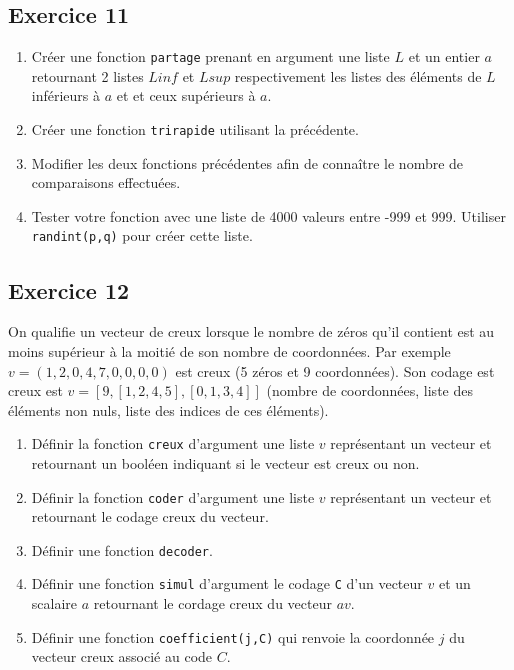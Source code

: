 \documentclass[10pt,fleqn]{article} %
\begin{document}
\begin{multicols}{2}
\subsection*{Exercice 11}
\begin{enumerate}
\item Créer une fonction \texttt{partage} prenant en argument une liste $L$ et un entier $a$ retournant 2 listes $Linf$ et $Lsup$ respectivement les listes des éléments de $L$ inférieurs à $a$ et et ceux supérieurs à $a$.
\item Créer une fonction \texttt{trirapide} utilisant la précédente. 
\item Modifier les deux fonctions précédentes afin de connaître le nombre de comparaisons effectuées. 
\item Tester votre fonction avec une liste de 4000 valeurs entre -999 et 999. Utiliser \texttt{randint(p,q)} pour créer cette liste.
\end{enumerate}

\subsection*{Exercice 12}
On qualifie un vecteur de creux lorsque le nombre de zéros qu'il contient est au moins supérieur à la moitié de son nombre de coordonnées. Par exemple $v=\left(1,2,0,4,7,0,0,0,0\right)$ est creux (5 zéros et 9 coordonnées). Son codage est creux est $v=\left[9,[1,2,4,5],[0,1,3,4]\right]$ (nombre de coordonnées, liste des éléments non nuls, liste des indices de ces éléments).
\begin{enumerate}
\item Définir la fonction \texttt{creux} d'argument une liste $v$ représentant un vecteur et retournant un booléen indiquant si le vecteur est creux ou non.
\item Définir la fonction \texttt{coder} d'argument une liste $v$ représentant un vecteur et retournant le codage creux du vecteur.
\item Définir une fonction \texttt{decoder}.
\item Définir une fonction \texttt{simul} d'argument le codage \texttt{C} d'un vecteur $v$ et un scalaire $a$ retournant le cordage creux du vecteur $av$.
\item Définir une fonction \texttt{coefficient(j,C)} qui renvoie la coordonnée $j$ du vecteur creux associé au code $C$.
\end{enumerate}


\end{multicols}
\end{document}
